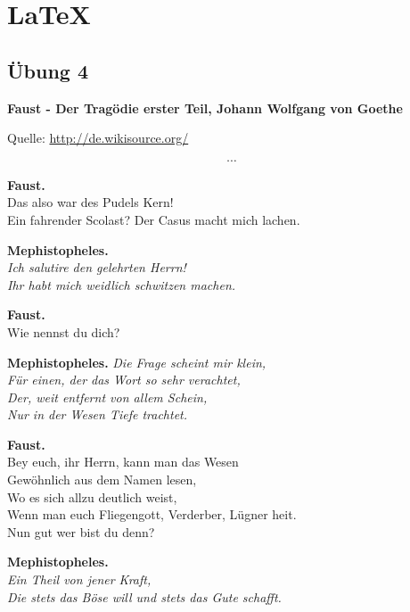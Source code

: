 
\part{\LaTeX}

\chapter{Übung 4}

\textbf{Faust - Der Tragödie erster Teil, Johann Wolfgang von Goethe}

Quelle: \url{http://de.wikisource.org/}

\[ \cdots \]

\textbf{Faust.} \\
Das also war des Pudels Kern! \\
Ein fahrender Scolast? Der Casus macht mich lachen. \\

\begin{flushright}
\textbf{Mephistopheles.} \\
\textit{Ich salutire den gelehrten Herrn! \\
Ihr habt mich weidlich schwitzen machen.}
\end{flushright}

\textbf{Faust.} \\
Wie nennst du dich?

\begin{flushright}
\textbf{Mephistopheles.}
\textit{Die Frage scheint mir klein, \\
Für einen, der das Wort so sehr verachtet, \\
Der, weit entfernt von allem Schein, \\
Nur in der Wesen Tiefe trachtet.}
\end{flushright}

\textbf{Faust.} \\
Bey euch, ihr Herrn, kann man das Wesen \\
Gewöhnlich aus dem Namen lesen, \\
Wo es sich allzu deutlich weist, \\
Wenn man euch Fliegengott, Verderber, Lügner heit. \\
Nun gut wer bist du denn?

\begin{flushright}
\textbf{Mephistopheles.} \\
\textit{Ein Theil von jener Kraft, \\
Die stets das Böse will und stets das Gute schafft.}
\end{flushright}

